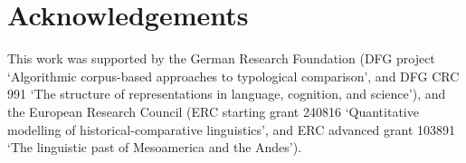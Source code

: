 \documentclass[10pt, a4paper]{article}
\begin{document}
\section{Acknowledgements}
This work was supported by the German Research Foundation 
(DFG project `Algorithmic corpus-based approaches to typological comparison', and DFG CRC 991 `{The
structure of representations in language, cognition, and science}'), and the European Research
Council (ERC starting grant 240816 `{Quantitative modelling of historical-comparative linguistics}',
and ERC advanced grant 103891 `{The linguistic past of Mesoamerica and the Andes}'). 



\end{document}
